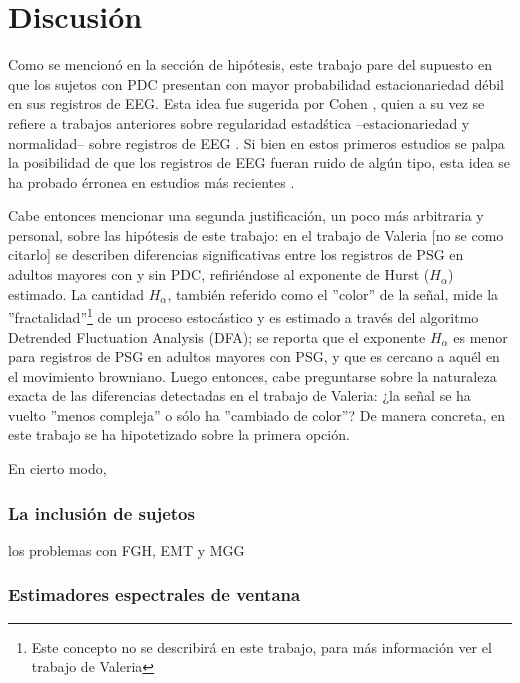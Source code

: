 \section{Discusi\'on}

Como se mencion\'o en la secci\'on de hip\'otesis, este trabajo pare del supuesto en que los
sujetos con PDC presentan con mayor probabilidad estacionariedad d\'ebil en sus registros de EEG.
Esta idea fue sugerida por Cohen \cite{Cohen77}, quien a su vez se refiere a trabajos anteriores
sobre regularidad estad\'stica --estacionariedad y normalidad-- sobre registros de 
EEG \cite{McEwen75,Sugimoto78,Kawabata73}. 
Si bien en estos primeros estudios se palpa la posibilidad de que los registros de EEG fueran
ruido de alg\'un tipo, esta idea se ha probado \'erronea en estudios m\'as recientes 
\cite{Klonowski09}.

Cabe entonces mencionar una segunda justificaci\'on, un poco m\'as arbitraria y personal, sobre
las hip\'otesis de este trabajo: en el trabajo de Valeria [no se como citarlo] se describen
diferencias significativas entre los registros de PSG en adultos mayores con y sin PDC,
refiri\'endose al exponente de Hurst ($H_\alpha$) estimado.
La cantidad $H_\alpha$, tambi\'en referido como el ''color'' de la se\~nal,
mide la ''fractalidad''\footnote{Este concepto no se
describir\'a en este trabajo, para m\'as informaci\'on ver el trabajo de Valeria} 
de un proceso estoc\'astico y es estimado a trav\'es del
algoritmo Detrended Fluctuation Analysis (DFA); se reporta
que el exponente $H_\alpha$ es menor para registros de PSG en adultos mayores con PSG, y que es
cercano a aqu\'el en el movimiento browniano. 
Luego entonces, cabe preguntarse sobre la naturaleza exacta de las diferencias detectadas en 
el trabajo de Valeria: ¿la se\~nal se ha vuelto ''menos compleja'' o 
s\'olo ha ''cambiado de color''?
De manera concreta, en este trabajo se ha hipotetizado sobre la primera opci\'on.

En cierto modo, 


\subsubsection{La inclusi\'on de sujetos}

los problemas con FGH, EMT y MGG


\subsubsection{Estimadores espectrales de ventana}

